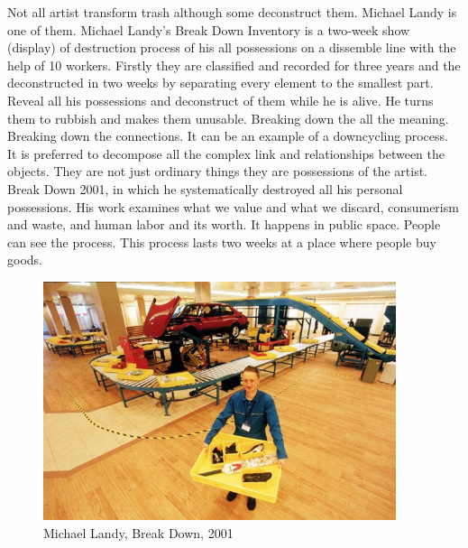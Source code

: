 Not all artist transform trash although some deconstruct them. Michael Landy is one of them. Michael Landy's Break Down Inventory is a two-week show (display) of destruction process of his all possessions on a dissemble line with the help of 10 workers. Firstly they are classified and recorded for three years and the deconstructed in two weeks by separating every element to the smallest part. Reveal all his possessions and deconstruct of them while he is alive. He turns them to rubbish and makes them unusable. Breaking down the all the meaning. Breaking down the connections. It can be an example of a downcycling process. It is preferred to decompose all the complex link and relationships between the objects. They are not just ordinary things they are possessions of the artist. Break Down 2001, in which he systematically destroyed all his personal possessions. His work examines what we value and what we discard, consumerism and waste, and human labor and its worth. It happens in public space. People can see the process. This process lasts two weeks at a place where people buy goods.

\begin{figure}[h!]
  \centering
  \includegraphics[height=7cm]{graphics/MichaelLandy_BreakDown.jpg}
  \caption{Michael Landy, Break Down, 2001}
  \label{fig:MichaelLandy_BreakDown}
\end{figure}



